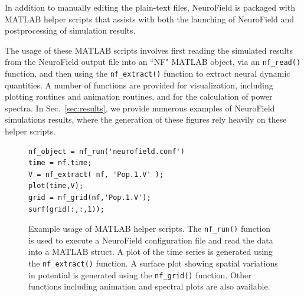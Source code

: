 \documentclass[preprint,review,10pt,authoryear,letterpaper]{elsarticle}
\begin{document}
In addition to manually editing the plain-text files, NeuroField is packaged with MATLAB helper scripts that assists with both the launching of NeuroField and postprocessing of simulation results.

The usage of these MATLAB scripts involves first reading the simulated results from the NeuroField output file into an ``NF" MATLAB object, via an {\tt nf\_read()} function, and then using the {\tt nf\_extract()} function to extract neural dynamic quantities. A number of functions are provided for visualization, including plotting routines and animation routines, and for the calculation of power spectra. In Sec.~\ref{sec:results}, we provide numerous examples of NeuroField simulations results, where the generation of these figures rely heavily on these helper scripts.


\begin{figure}[th]
\begin{center}
\begin{lstlisting}[style=Matlab-editor]
nf_object = nf_run('neurofield.conf')
time = nf.time;
V = nf_extract( nf, 'Pop.1.V' );
plot(time,V);
grid = nf_grid(nf,'Pop.1.V');
surf(grid(:,:,1));
\end{lstlisting}
\caption{Example usage of MATLAB helper scripts. The {\tt nf\_run()} function is used to execute a NeuroField configuration file and read the data into a MATLAB struct.  A plot of the time series is generated using the {\tt nf\_extract()} function. A surface plot showing spatial variations in potential is generated using the {\tt nf\_grid()} function.  Other functions including animation and spectral plots are also available.}
\label{fig:matlab_eg}
\end{center}
\end{figure}

%
%
%
%
%
\end{document}
